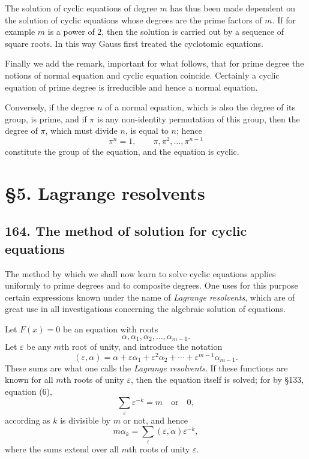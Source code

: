 \documentclass[11pt]{article}
\begin{document}
The solution of cyclic equations of degree $m$ has thus been made dependent on the solution of cyclic equations whose degrees are the prime factors of $m$. If for example $m$ is a power of $2$, then the solution is carried out by a sequence of square roots. In this way Gauss first treated the cyclotomic equations.

Finally we add the remark, important for what follows, that for prime degree the notions of normal equation and cyclic equation coincide. Certainly a cyclic equation of prime degree is irreducible and hence a normal equation.

Conversely, if the degree $n$ of a normal equation, which is also the degree of its group, is prime, and if $\pi$ is any non-identity permutation of this group, then the degree of $\pi$, which must divide $n$, is equal to $n$; hence
\[
\pi^n=1,\qquad \pi,\pi^2,\dots,\pi^{n-1}
\]
constitute the group of the equation, and the equation is cyclic.

\section*{\S 5. Lagrange resolvents}

\subsection*{164. The method of solution for cyclic equations}

The method by which we shall now learn to solve cyclic equations applies uniformly to prime degrees and to composite degrees. One uses for this purpose certain expressions known under the name of \emph{Lagrange resolvents}, which are of great use in all investigations concerning the algebraic solution of equations.

Let $F(x)=0$ be an equation with roots
\[
\alpha,\alpha_1,\alpha_2,\dots,\alpha_{m-1}.
\]
Let $\varepsilon$ be any $m$th root of unity, and introduce the notation
\[
(\varepsilon,\alpha)=\alpha+\varepsilon\alpha_1+\varepsilon^2\alpha_2+\cdots+\varepsilon^{m-1}\alpha_{m-1}.
\tag{1}
\]
These sums are what one calls the \emph{Lagrange resolvents}. If these functions are known for all $m$th roots of unity $\varepsilon$, then the equation itself is solved; for by \S 133, equation (6),
\[
\sum_{\varepsilon}\varepsilon^{-k}=m \quad\text{or}\quad 0,
\tag{2}
\]
according as $k$ is divisible by $m$ or not, and hence
\[
m\alpha_k=\sum_{\varepsilon}(\varepsilon,\alpha)\varepsilon^{-k},
\tag{3}
\]
where the sums extend over all $m$th roots of unity $\varepsilon$.
\end{document}
